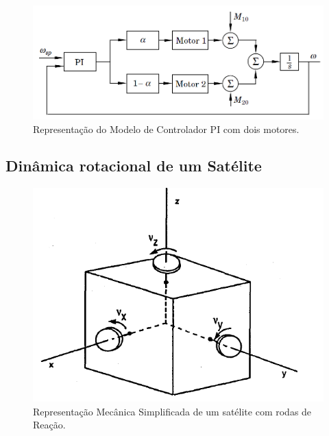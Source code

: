 \begin{figure}[htb]
  \caption{Representação do Modelo de Controlador PI com dois motores.}
  \begin{center}
      \includegraphics[scale=0.65]{img/pi_twomotors_astrom_p308}
  \end{center}
  \label{fig:pi_twomotors_astrom_p308}
\end{figure}

\subsection{Dinâmica rotacional de um Satélite}

\begin{figure}[htb]
  \caption{Representação Mecânica Simplificada de um satélite com rodas de Reação.}
  \begin{center}
      \includegraphics[scale=0.75]{img/satellite_controlhand_p1306}
  \end{center}
  \label{fig:satellite_controlhand_p1306}
\end{figure}

